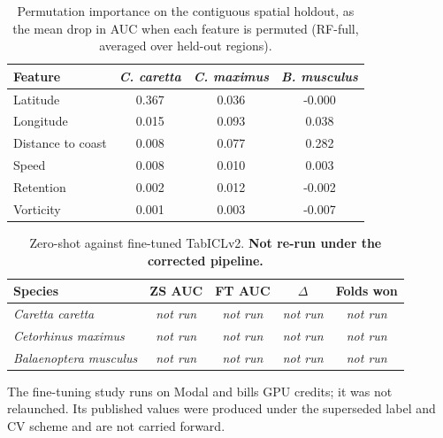 \begin{table}[t]
\centering
\caption{Permutation importance on the contiguous spatial holdout, as the mean drop in AUC when each feature is permuted (RF-full, averaged over held-out regions).}
\label{tab:perm-importance}
\begin{tabular}{lccc}
\toprule
Feature & \emph{C. caretta} & \emph{C. maximus} & \emph{B. musculus} \\
\midrule
Latitude & 0.367 & 0.036 & -0.000 \\
Longitude & 0.015 & 0.093 & 0.038 \\
Distance to coast & 0.008 & 0.077 & 0.282 \\
Speed & 0.008 & 0.010 & 0.003 \\
Retention & 0.002 & 0.012 & -0.002 \\
Vorticity & 0.001 & 0.003 & -0.007 \\
\bottomrule
\end{tabular}
\end{table}

\begin{table}[t]
\centering
\caption{Zero-shot against fine-tuned TabICLv2. \textbf{Not re-run under the corrected pipeline.}}
\label{tab:finetune}
\begin{tabular}{lcccc}
\toprule
Species & ZS AUC & FT AUC & $\Delta$ & Folds won \\
\midrule
\emph{Caretta caretta} & \emph{not run} & \emph{not run} & \emph{not run} & \emph{not run} \\
\emph{Cetorhinus maximus} & \emph{not run} & \emph{not run} & \emph{not run} & \emph{not run} \\
\emph{Balaenoptera musculus} & \emph{not run} & \emph{not run} & \emph{not run} & \emph{not run} \\
\bottomrule
\end{tabular}
\begin{minipage}{\linewidth}\footnotesize The fine-tuning study runs on Modal and bills GPU credits; it was not relaunched. Its published values were produced under the superseded label and CV scheme and are not carried forward.\end{minipage}
\end{table}

